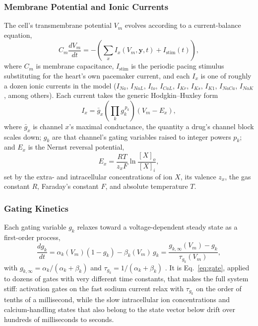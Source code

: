 \documentclass[journal]{IEEEtran}
\begin{document}
\subsubsection{Membrane Potential and Ionic Currents}

The cell's transmembrane potential $V_m$ evolves according to a current-balance equation,
\begin{equation}
C_m \frac{dV_m}{dt} = -\left(\sum_{x} I_x(V_m, \mathbf{y}, t) + I_{\text{stim}}(t)\right),
\label{eq:vm}
\end{equation}
where $C_m$ is membrane capacitance, $I_{\text{stim}}$ is the periodic pacing stimulus substituting for the heart's own pacemaker current, and each $I_x$ is one of roughly a dozen ionic currents in the model ($I_{Na}$, $I_{NaL}$, $I_{to}$, $I_{CaL}$, $I_{Kr}$, $I_{Ks}$, $I_{K1}$, $I_{NaCa}$, $I_{NaK}$, among others). Each current takes the generic Hodgkin--Huxley form
\begin{equation}
I_x = \bar{g}_x \left(\prod_k g_k^{\,p_k}\right) (V_m - E_x),
\label{eq:current}
\end{equation}
where $\bar{g}_x$ is channel $x$'s maximal conductance, the quantity a drug's channel block scales down; $g_k$ are that channel's gating variables raised to integer powers $p_k$; and $E_x$ is the Nernst reversal potential,
\begin{equation}
E_x = \frac{RT}{z_xF}\ln\frac{[X]_o}{[X]_i},
\label{eq:nernst}
\end{equation}
set by the extra- and intracellular concentrations of ion $X$, its valence $z_x$, the gas constant $R$, Faraday's constant $F$, and absolute temperature $T$.

\subsubsection{Gating Kinetics}

Each gating variable $g_k$ relaxes toward a voltage-dependent steady state as a first-order process,
\begin{equation}
\frac{dg_k}{dt} = \alpha_k(V_m)(1-g_k) - \beta_k(V_m)\,g_k = \frac{g_{k,\infty}(V_m) - g_k}{\tau_{g_k}(V_m)},
\label{eq:gate}
\end{equation}
with $g_{k,\infty} = \alpha_k/(\alpha_k+\beta_k)$ and $\tau_{g_k} = 1/(\alpha_k+\beta_k)$ \cite{hodgkinhuxley1952}. It is Eq.~\eqref{eq:gate}, applied to dozens of gates with very different time constants, that makes the full system stiff: activation gates on the fast sodium current relax with $\tau_{g_k}$ on the order of tenths of a millisecond, while the slow intracellular ion concentrations and calcium-handling states that also belong to the state vector below drift over hundreds of milliseconds to seconds.
\end{document}
